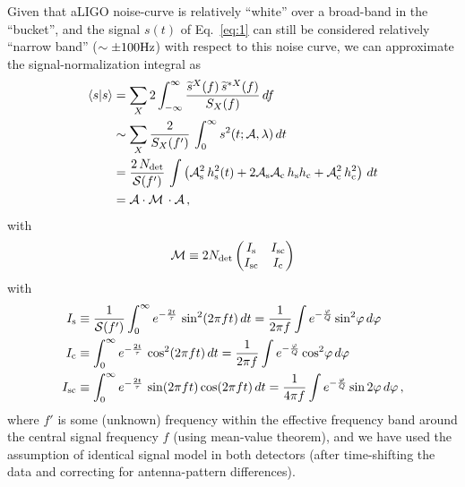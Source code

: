 \documentclass[aps,prd,onecolumn,notitlepage,nofootinbib,superscriptaddress,altaffilletter,floatfix]{revtex4-1}
\begin{document}
Given that aLIGO noise-curve is relatively ``white'' over a broad-band in the ``bucket'', and the signal $s(t)$ of Eq.~\eqref{eq:1} can still be
considered relatively ``narrow band'' ($\sim \pm 100\mathrm{Hz}$) with respect to this noise curve, we can approximate the signal-normalization integral as
\begin{align}
  \label{eq:17}
  \left\langle s\middle|s\right\rangle &= \sum_X 2 \int_{-\infty}^{\infty} \frac{\widetilde{s}^X(f)\,\widetilde{s}^{*X}(f)}{S_X(f)}\,d f\\
  &\sim \sum_X \frac{2}{S_X(f')} \, \int_{0}^{\infty} s^2(t;{\mathcal A},\lambda)\,dt\\
  & = \frac{2\,N_{\mathrm{det}}}{\mathcal{S}(f')} \,\int \left( {\mathcal A}_{\mathrm{s}}^2\,h_\mathrm{s}^2(t) + 2{\mathcal A}_{\mathrm{s}}{\mathcal A}_{\mathrm{c}}\,h_\mathrm{s}h_\mathrm{c} + {\mathcal A}_{\mathrm{c}}^2\,h_\mathrm{c}^2\right)\,d t\\
  & = {\mathcal A} \cdot \mathcal{M} \,\cdot{\mathcal A}\,,
\end{align}
with
\begin{equation}
  \label{eq:23}
  \mathcal{M} \equiv
  2N_{\mathrm{det}} \begin{pmatrix}
    I_{\mathrm{s}}  & I_{\mathrm{sc}} \\
    I_{\mathrm{sc}}  & I_{\mathrm{c}}\\
  \end{pmatrix}
\end{equation}
with
\begin{align}
  \label{eq:43}
  I_{\mathrm{s}}  &\equiv \frac{1}{\mathcal{S}(f')}\int_0^\infty e^{-\frac{2t}{\tau}}\,\sin^2(2\pi f t)\,dt = \frac{1}{2\pi f}\int e^{-\frac{\varphi}{Q}} \sin^2\!\varphi\,d\varphi\\
  I_{\mathrm{c}}  &\equiv \int_0^\infty e^{-\frac{2t}{\tau}}\,\cos^2(2\pi f t)\,dt = \frac{1}{2\pi f}\int e^{-\frac{\varphi}{Q}} \cos^2\!\varphi\,d\varphi\\
  I_{\mathrm{sc}} &\equiv \int_0^\infty e^{-\frac{2t}{\tau}}\,\sin(2\pi f t)\cos(2\pi f t)\,dt = \frac{1}{4\pi f}\int e^{-\frac{\varphi}{Q}} \sin2\varphi\,d\varphi\,,
\end{align}
where $f'$ is some (unknown) frequency within the effective frequency band around the central signal frequency $f$ (using mean-value theorem), and we
have used the assumption of identical signal model in both detectors (after time-shifting the data and correcting for antenna-pattern differences).
\end{document}
